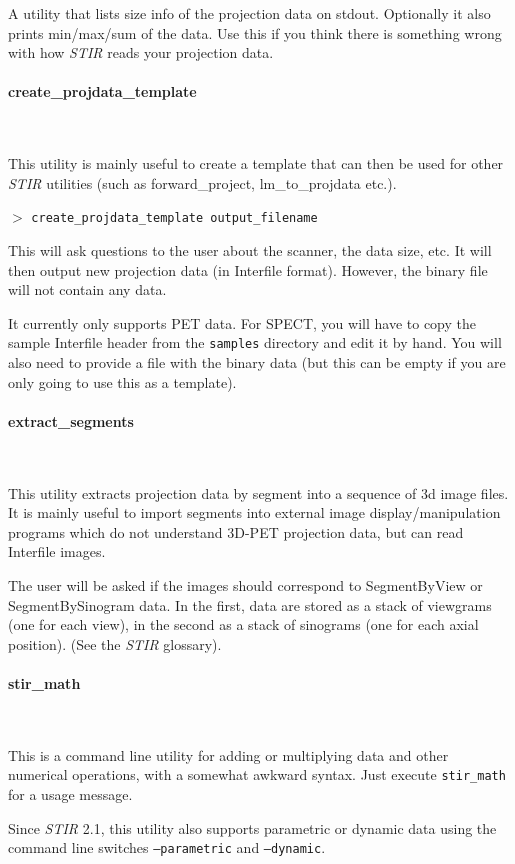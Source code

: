 \documentclass{article}
\newcommand{\subsubsubsection}[1]{\paragraph{#1}\mbox{} \\}
\newcommand{\cmdline}[1]{\par \noindent $>$ \texttt{#1}\par}
\begin{document}
A utility that lists size info of the projection data on stdout. Optionally
it also prints min/max/sum of the data. 
Use this if you think there is something wrong with how \textit{STIR} 
reads your projection data.

{ \subsubsubsection{create\_projdata\_template}
}

This utility is mainly useful to create a template that can then 
be used for other \textit{STIR} utilities (such as forward\_project, lm\_to\_projdata 
etc.).
\cmdline{create\_projdata\_template output\_filename}

This will ask questions to the user about the scanner, the data 
size, etc. It will then output new projection data (in Interfile 
format). However, the binary file will not contain any data.

It currently only supports PET data. For SPECT, you will have to copy the
sample Interfile header from the \texttt{samples} directory and edit it by hand.
You will also need to provide a file with the binary data (but this can be empty if
you are only going to use this as a template).

{ \subsubsubsection{extract\_segments}
}

This utility extracts projection data by segment into a sequence 
of 3d image files. It is mainly useful to import segments into 
external image display/manipulation programs which do not understand 
3D-PET projection data, but can read Interfile images.


The user will be asked if the images should correspond to SegmentByView 
or SegmentBySinogram data. In the first, data are stored as a 
stack of viewgrams (one for each view), in the second as a stack 
of sinograms (one for each axial position). (See the \textit{STIR} glossary).

{ \subsubsubsection{stir\_math}
}
\label{sec:stir_math}

This is a command line utility for adding or multiplying data 
and other numerical operations, with a somewhat awkward syntax. 
Just execute \texttt{stir\_math} for a usage message.

Since \textit{STIR} 2.1, this utility also supports parametric or dynamic data using
the command line switches \texttt{--parametric} and \texttt{--dynamic}.
\end{document}
